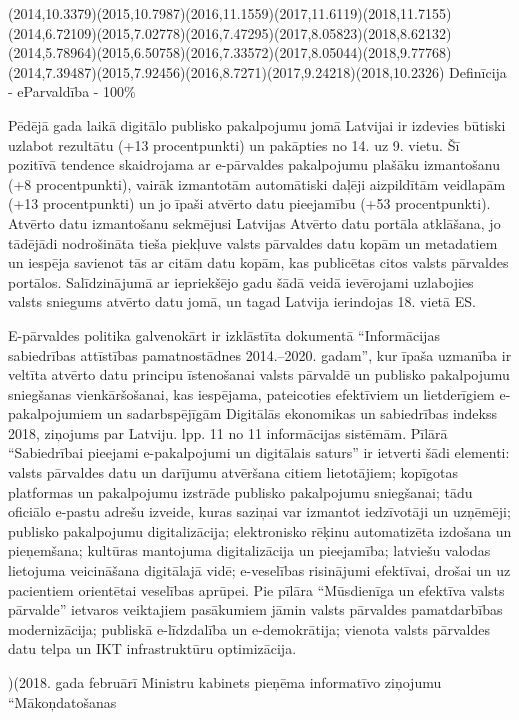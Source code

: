   {(2014,10.3379)(2015,10.7987)(2016,11.1559)(2017,11.6119)(2018,11.7155)}
  {(2014,6.72109)(2015,7.02778)(2016,7.47295)(2017,8.05823)(2018,8.62132)}
  {(2014,5.78964)(2015,6.50758)(2016,7.33572)(2017,8.05044)(2018,9.77768)}
  {(2014,7.39487)(2015,7.92456)(2016,8.7271)(2017,9.24218)(2018,10.2326)}
Definīcija - eParvaldība - 100\%

Pēdējā gada laikā digitālo publisko pakalpojumu jomā Latvijai ir izdevies būtiski uzlabot
rezultātu (+13 procentpunkti) un pakāpties no 14. uz 9. vietu. Šī pozitīvā tendence
skaidrojama ar e-pārvaldes pakalpojumu plašāku izmantošanu (+8 procentpunkti), vairāk
izmantotām automātiski daļēji aizpildītām veidlapām (+13 procentpunkti) un jo īpaši atvērto
datu pieejamību (+53 procentpunkti). Atvērto datu izmantošanu sekmējusi Latvijas Atvērto
datu portāla atklāšana, jo tādējādi nodrošināta tieša piekļuve valsts pārvaldes datu kopām
un metadatiem un iespēja savienot tās ar citām datu kopām, kas publicētas citos valsts
pārvaldes portālos. Salīdzinājumā ar iepriekšējo gadu šādā veidā ievērojami uzlabojies
valsts sniegums atvērto datu jomā, un tagad Latvija ierindojas 18. vietā ES.
\par
E-pārvaldes politika galvenokārt ir izklāstīta dokumentā “Informācijas sabiedrības attīstības
pamatnostādnes 2014.–2020. gadam”, kur īpaša uzmanība ir veltīta atvērto datu principu
īstenošanai valsts pārvaldē un publisko pakalpojumu sniegšanas vienkāršošanai, kas
iespējama, pateicoties efektīviem un lietderīgiem e-pakalpojumiem un sadarbspējīgām
Digitālās ekonomikas un sabiedrības indekss 2018, ziņojums par Latviju. lpp. 11 no 11
informācijas sistēmām. Pīlārā “Sabiedrībai pieejami e-pakalpojumi un digitālais saturs” ir
ietverti šādi elementi: valsts pārvaldes datu un darījumu atvēršana citiem lietotājiem;
kopīgotas platformas un pakalpojumu izstrāde publisko pakalpojumu sniegšanai; tādu
oficiālo e-pastu adrešu izveide, kuras saziņai var izmantot iedzīvotāji un uzņēmēji; publisko
pakalpojumu digitalizācija; elektronisko rēķinu automatizēta izdošana un pieņemšana;
kultūras mantojuma digitalizācija un pieejamība; latviešu valodas lietojuma veicināšana
digitālajā vidē; e-veselības risinājumi efektīvai, drošai un uz pacientiem orientētai veselības
aprūpei. Pie pīlāra “Mūsdienīga un efektīva valsts pārvalde” ietvaros veiktajiem pasākumiem
jāmin valsts pārvaldes pamatdarbības modernizācija; publiskā e-līdzdalība un e-demokrātija;
vienota valsts pārvaldes datu telpa un IKT infrastruktūru optimizācija.
\par)(2018. gada februārī Ministru kabinets pieņēma informatīvo ziņojumu “Mākoņdatošanas

